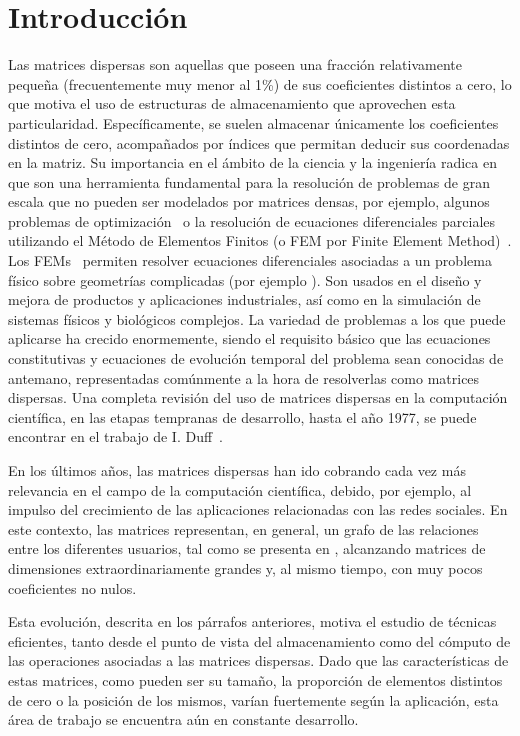 \chapter{Introducción}\label{ch:intro}


Las matrices dispersas son aquellas que poseen una fracción relativamente pequeña (frecuentemente muy menor al 1\%) de sus coeficientes distintos a cero, lo que motiva el uso de estructuras de almacenamiento que aprovechen esta particularidad. Específicamente, se suelen almacenar únicamente los coeficientes distintos de cero, acompañados por índices que permitan deducir sus coordenadas en la matriz. Su importancia en el ámbito de la ciencia y la ingeniería radica en que son una herramienta fundamental para la resolución de problemas de gran escala que no pueden ser modelados por matrices densas, por ejemplo, algunos problemas de optimización~\cite{Gill1984} o la resolución de ecuaciones diferenciales parciales utilizando el Método de Elementos Finitos (o FEM por Finite Element Method)~\cite{Saad2003}. Los FEMs~\cite{klaus-jürgenbathe2014} permiten resolver ecuaciones diferenciales asociadas a un problema físico sobre geometrías complicadas (por ejemplo \cite{audi-piston-rod}). Son usados en el diseño y mejora de productos y aplicaciones industriales, así como en la simulación de sistemas físicos y biológicos complejos. La variedad de problemas a los que puede aplicarse ha crecido enormemente, siendo el requisito básico que las ecuaciones constitutivas y ecuaciones de evolución temporal del problema sean conocidas de antemano, representadas comúnmente a la hora de resolverlas como matrices dispersas. Una completa revisión del uso de matrices dispersas en la computación científica, en las etapas tempranas de desarrollo, hasta el año 1977, se puede encontrar en el trabajo de I. Duff~\cite{Duff1977}.

En los últimos años, las matrices dispersas han ido cobrando cada vez más relevancia en el campo de la computación científica, debido, por ejemplo, al impulso del crecimiento de las aplicaciones relacionadas con las redes sociales. En este contexto, las matrices representan, en general, un grafo de las relaciones entre los diferentes usuarios, tal como se presenta en \cite{Hummon1990}, alcanzando matrices de dimensiones extraordinariamente grandes y, al mismo tiempo, con muy pocos coeficientes no nulos.


Esta evolución, descrita en los párrafos anteriores, motiva el estudio de técnicas eficientes, tanto desde el punto de vista del almacenamiento como del cómputo de las operaciones asociadas a las matrices dispersas. 
Dado que las características de estas matrices, como pueden ser su tamaño, la proporción de elementos distintos de cero o la posición de los mismos, varían fuertemente según la aplicación, esta área de trabajo se encuentra aún en constante desarrollo.


